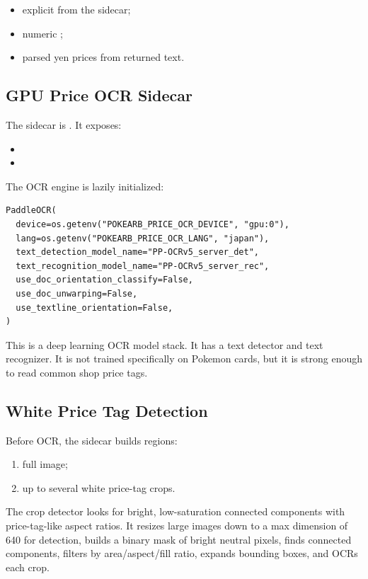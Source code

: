 \documentclass[11pt,a4paper]{article}
\begin{document}
\begin{itemize}
  \item explicit  from the sidecar;
  \item numeric ;
  \item parsed yen prices from returned text.
\end{itemize}

\subsection{GPU Price OCR Sidecar}

The sidecar is . It exposes:

\begin{itemize}
  \item {}
  \item {}
\end{itemize}

The OCR engine is lazily initialized:

\begin{lstlisting}
PaddleOCR(
  device=os.getenv("POKEARB_PRICE_OCR_DEVICE", "gpu:0"),
  lang=os.getenv("POKEARB_PRICE_OCR_LANG", "japan"),
  text_detection_model_name="PP-OCRv5_server_det",
  text_recognition_model_name="PP-OCRv5_server_rec",
  use_doc_orientation_classify=False,
  use_doc_unwarping=False,
  use_textline_orientation=False,
)
\end{lstlisting}

This is a deep learning OCR model stack. It has a text detector and text recognizer. It is not trained specifically on Pokemon cards, but it is strong enough to read common shop price tags.

\subsection{White Price Tag Detection}

Before OCR, the sidecar builds regions:

\begin{enumerate}
  \item full image;
  \item up to several white price-tag crops.
\end{enumerate}

The crop detector looks for bright, low-saturation connected components with price-tag-like aspect ratios. It resizes large images down to a max dimension of 640 for detection, builds a binary mask of bright neutral pixels, finds connected components, filters by area/aspect/fill ratio, expands bounding boxes, and OCRs each crop.
\end{document}

